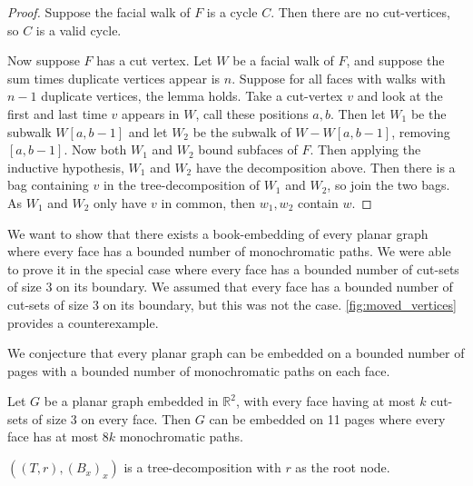 \begin{proof}
	Suppose the facial walk of $F$ is a cycle $C$. Then there are no cut-vertices, so $C$ is a valid cycle.

	Now suppose $F$ has a cut vertex. Let $W$ be a facial walk of $F$, and suppose the sum times duplicate vertices appear is $n$. Suppose for all faces with walks with $n-1$ duplicate vertices, the lemma holds. Take a cut-vertex $v$ and look at the first and last time $v$ appears in $W$, call these positions $a, b$. Then let $W_1$ be the subwalk $W[a, b-1]$ and let $W_2$ be the subwalk of $W - W[a, b-1]$, removing $[a, b-1]$. Now both $W_1$ and $W_2$ bound subfaces of $F$. Then applying the inductive hypothesis, $W_1$ and $W_2$ have the decomposition above. Then there is a bag containing $v$ in the tree-decomposition of $W_1$ and $W_2$, so join the two bags. As $W_1$ and $W_2$ only have $v$ in common, then $w_1, w_2$ contain $w$. 
\end{proof}

We want to show that there exists a book-embedding of every planar graph where every face has a bounded number of monochromatic paths. We were able to prove it in the special case where every face has a bounded number of cut-sets of size 3 on its boundary. We assumed that every face has a bounded number of cut-sets of size 3 on its boundary, but this was not the case. \cref{fig:moved_vertices} provides a counterexample. 

We conjecture that every planar graph can be embedded on a bounded number of pages with a bounded number of monochromatic paths on each face. 

\begin{theorem}\label{thm:planar_graph__be_mono_paths}
	Let \( G \) be a planar graph embedded in $\mathbb{R}^2$, with every face having at most $k$ cut-sets of size $3$ on every face. Then $G$ can be embedded on 11 pages where every face has at most $8k$ monochromatic paths. 
\end{theorem}

$ ((T,r), (B_x)_x)$ is a tree-decomposition with $r$ as the root node. 


